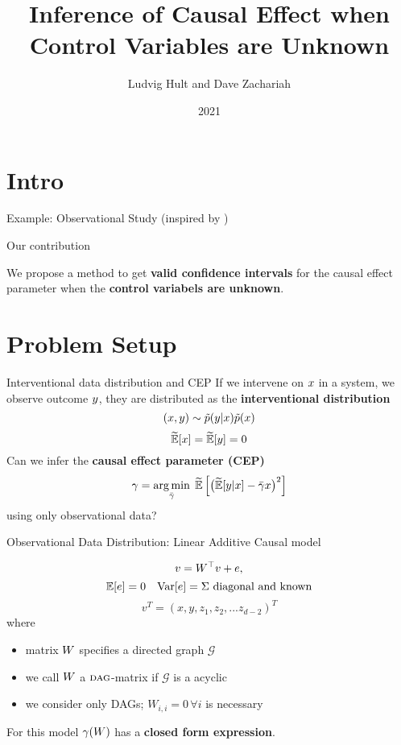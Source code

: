 \documentclass[aspectratio=1610]{beamer}
\title{Inference of Causal Effect when Control Variables are Unknown}
\author{Ludvig Hult and Dave Zachariah}
\institute{Department of Information Technology, Uppsala University, Sweden}
\date{2021}
\begin{document}
\frame{\titlepage}

%
%
\section{Intro}
\begin{frame}{Example: Observational Study (inspired by \cite{luoca_2021})}
    \centering
    
\end{frame}
\begin{frame}{Our contribution}
    \centering
    \begin{tcolorbox}[width=10cm]
        We propose a method to get \textbf{valid confidence intervals} for the causal effect parameter when the \textbf{control variabels are unknown}.
    \end{tcolorbox}
\end{frame}


\section{Problem Setup}
\begin{frame}{Interventional data distribution and CEP}
If we intervene on $x$ in a system, we observe outcome $y$, they are distributed as the \textbf{interventional distribution}
\[(x,y)  \sim \tilde p(y | x) \tilde p(x) \]
\[\widetilde{\mathbb{E}}[x]=\widetilde{\mathbb{E}}[y]=0\]
\pause
Can we infer the \textbf{causal effect parameter (CEP)}
\begin{align*}
\gamma =   \operatorname*{arg\,min}_{\bar{\gamma}} \; \widetilde{\mathbb{E}}\left[ \big( \widetilde{\mathbb{E}}[y|x]  - \bar{\gamma}x \big)^2 \right]
\end{align*}
using only observational data?
\end{frame}

\begin{frame}{Observational Data Distribution: Linear Additive Causal model}
    
    \[v = W^\top v + e,\]
    \[\mathbb{E}[e]=0 \quad \text{Var}[e] = \Sigma \text{ diagonal and known} \]
    \[v^T{}=(x,y,z_1,z_2,...z_{d-2})^T{}\]
\pause
    where
\begin{itemize}
    \item matrix $W$ specifies a directed graph $\mathcal G$
    \item we call $W$ a $\textsc{dag}$-matrix if $\mathcal G$ is a acyclic
    \item we consider only DAGs; $W_{i,i}=0 \, \forall i$ is necessary
\end{itemize}
\pause
For this model $\gamma(W)$ has a \textbf{closed form expression}.
\end{frame}
\end{document}
